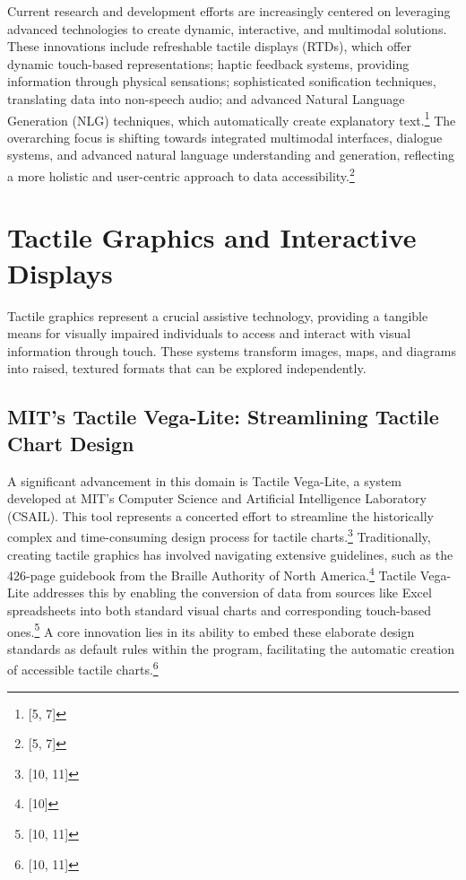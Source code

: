 Current research and development efforts are increasingly centered on leveraging advanced technologies to create dynamic, interactive, and multimodal solutions. These innovations include refreshable tactile displays (RTDs), which offer dynamic touch-based representations; haptic feedback systems, providing information through physical sensations; sophisticated sonification techniques, translating data into non-speech audio; and advanced Natural Language Generation (NLG) techniques, which automatically create explanatory text.\footnote{[5, 7]} The overarching focus is shifting towards integrated multimodal interfaces, dialogue systems, and advanced natural language understanding and generation, reflecting a more holistic and user-centric approach to data accessibility.\footnote{[5, 7]}

\section{Tactile Graphics and Interactive Displays}
Tactile graphics represent a crucial assistive technology, providing a tangible means for visually impaired individuals to access and interact with visual information through touch. These systems transform images, maps, and diagrams into raised, textured formats that can be explored independently.~\cite{TactileGraphicsAndInteractiveDisplays}

\subsection{MIT's Tactile Vega-Lite: Streamlining Tactile Chart Design}
A significant advancement in this domain is Tactile Vega-Lite, a system developed at MIT's Computer Science and Artificial Intelligence Laboratory (CSAIL). This tool represents a concerted effort to streamline the historically complex and time-consuming design process for tactile charts.\footnote{[10, 11]} Traditionally, creating tactile graphics has involved navigating extensive guidelines, such as the 426-page guidebook from the Braille Authority of North America.\footnote{[10]} Tactile Vega-Lite addresses this by enabling the conversion of data from sources like Excel spreadsheets into both standard visual charts and corresponding touch-based ones.\footnote{[10, 11]} A core innovation lies in its ability to embed these elaborate design standards as default rules within the program, facilitating the automatic creation of accessible tactile charts.\footnote{[10, 11]}

